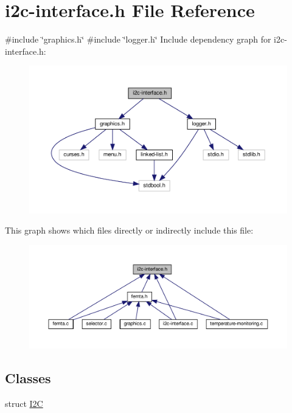 \hypertarget{i2c-interface_8h}{}\section{i2c-\/interface.h File Reference}
\label{i2c-interface_8h}
{\ttfamily \#include \char`\"{}graphics.\+h\char`\"{}}\newline
{\ttfamily \#include \char`\"{}logger.\+h\char`\"{}}\newline
Include dependency graph for i2c-\/interface.h\+:
\nopagebreak
\begin{figure}[H]
\begin{center}
\leavevmode
\includegraphics[width=350pt]{i2c-interface_8h__incl}
\end{center}
\end{figure}
This graph shows which files directly or indirectly include this file\+:
\nopagebreak
\begin{figure}[H]
\begin{center}
\leavevmode
\includegraphics[width=350pt]{i2c-interface_8h__dep__incl}
\end{center}
\end{figure}
\subsection*{Classes}
\begin{DoxyCompactItemize}
\item 
struct \hyperlink{structI2C}{I2C}
\end{DoxyCompactItemize}

